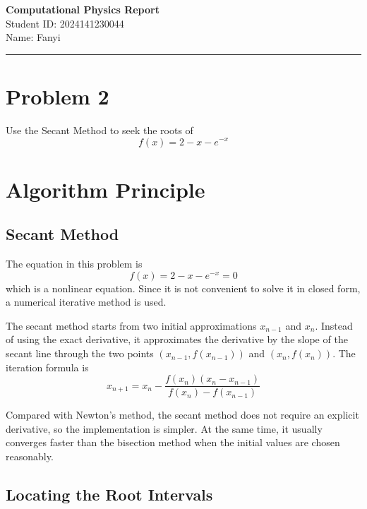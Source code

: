 \documentclass[12pt,a4paper]{article}
\newcommand{\HomeworkTitle}{Computational Physics Report}
\newcommand{\StudentID}{2024141230044}
\newcommand{\StudentName}{Fanyi}
\begin{document}
\begin{center}
    {\LARGE \textbf{\HomeworkTitle}}\\[1.2em]
    {\large Student ID: \StudentID}\\[0.5em]
    {\large Name: \StudentName}
\end{center}

\vspace{0.5em}
\noindent\rule{\textwidth}{0.8pt}
\vspace{0.5em}

\section*{Problem 2}

Use the Secant Method to seek the roots of
\[
f(x)=2-x-e^{-x}
\]

\newpage
\tableofcontents
\newpage

\section{Algorithm Principle}

\subsection*{Secant Method}

The equation in this problem is
\[
f(x)=2-x-e^{-x}=0
\]
which is a nonlinear equation. Since it is not convenient to solve it in closed form, a numerical iterative method is used.

The secant method starts from two initial approximations $x_{n-1}$ and $x_n$. Instead of using the exact derivative, it approximates the derivative by the slope of the secant line through the two points $(x_{n-1},f(x_{n-1}))$ and $(x_n,f(x_n))$. The iteration formula is
\[
x_{n+1}=x_n-\frac{f(x_n)(x_n-x_{n-1})}{f(x_n)-f(x_{n-1})}
\]

Compared with Newton's method, the secant method does not require an explicit derivative, so the implementation is simpler. At the same time, it usually converges faster than the bisection method when the initial values are chosen reasonably.

\subsection*{Locating the Root Intervals}
\end{document}
